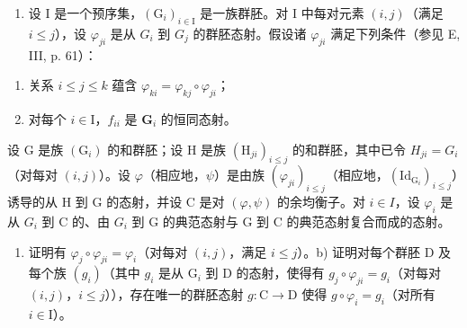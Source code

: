 \begin{enumerate}
\def\labelenumi{\arabic{enumi})}
\setcounter{enumi}{2}
\tightlist
\item
  设 I 是一个预序集，\((\mathrm{G}_{i})_{i\in\mathrm{I}}\) 是一族群胚。对 I 中每对元素 \((i,j)\)（满足 \(i\leqslant j\)），设 \(\varphi_{ji}\) 是从 \(G_{i}\) 到 \(G_{j}\) 的群胚态射。假设诸 \(\varphi_{ji}\) 满足下列条件（参见 E, III, p. 61）：
\end{enumerate}

\begin{enumerate}
\def\labelenumi{(\roman{enumi})}
\item
  关系 \(i \leqslant j \leqslant k\) 蕴含 \(\varphi_{ki} = \varphi_{kj} \circ \varphi_{ji}\)；
\item
  对每个 \(i \in \mathrm{I}\)，\(f_{ii}\) 是 \(\mathbf{G}_i\) 的恒同态射。
\end{enumerate}

设 G 是族 \((\mathrm{G}_{i})\) 的和群胚；设 H 是族 \((\mathrm{H}_{ji})_{i\leqslant j}\) 的和群胚，其中已令 \(H_{ji} = G_{i}\)（对每对 \((i,j)\)）。设 \(\varphi\)（相应地，\(\psi\)）是由族 \((\varphi_{ji})_{i\leqslant j}\)（相应地，\((\mathrm{Id}_{\mathrm{G}_{i}})_{i\leqslant j}\)）诱导的从 H 到 G 的态射，并设 C 是对 \((\varphi,\psi)\) 的余均衡子。对 \(i \in I\)，设 \(\varphi_{i}\) 是从 \(G_{i}\) 到 C 的、由 \(G_{i}\) 到 G 的典范态射与 G 到 C 的典范态射复合而成的态射。

\begin{enumerate}
\def\labelenumi{\alph{enumi})}
\tightlist
\item
  证明有 \(\varphi_j \circ \varphi_{ji} = \varphi_i\)（对每对 \((i,j)\)，满足 \(i \leqslant j\)）。b) 证明对每个群胚 D 及每个族 \((g_i)\)（其中 \(g_i\) 是从 \(\mathrm{G}_i\) 到 D 的态射，使得有 \(g_j \circ \varphi_{ji} = g_i\)（对每对 \((i,j)\)，\(i \leqslant j\)）），存在唯一的群胚态射 \(g: \mathrm{C} \to \mathrm{D}\) 使得 \(g \circ \varphi_i = g_i\)（对所有 \(i \in \mathrm{I}\)）。
\end{enumerate}

